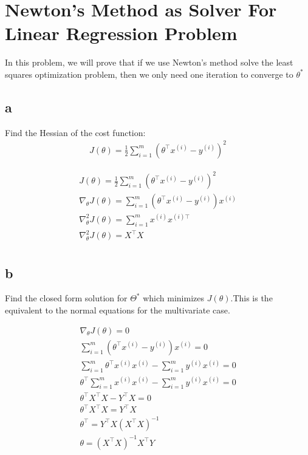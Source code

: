 \documentclass[12pt]{article}
\begin{document}
\section{Newton’s Method as Solver For Linear Regression Problem}
In this problem, we will prove that if we use Newton’s method solve the least squares optimization problem, then we only need one iteration to converge to $\theta^{*}$
\subsection{a}
Find the Hessian of the cost function:
\begin{gather*}
    J(\theta) = \frac{1}{2} \sum_{i=1}^{m} (\theta^\top x^{(i)} - y^{(i)})^2
\end{gather*}
\begin{qsolve}
    \begin{gather*}
        J(\theta) = \frac{1}{2} \sum_{i=1}^{m} (\theta^\top x^{(i)} - y^{(i)})^2 \\
        \nabla_\theta J(\theta) = \sum_{i=1}^{m} (\theta^\top x^{(i)} - y^{(i)}) x^{(i)} \\
        \nabla_\theta^2 J(\theta) = \sum_{i=1}^{m} x^{(i)} x^{(i)\top} \\
        \nabla_\theta^2 J(\theta) = X^\top X \\
    \end{gather*}
\end{qsolve}

\subsection{b}
Find the closed form solution for $\Theta^{*}$ which minimizes $J(\theta)$.This is the equivalent to the normal equations for the multivariate case.
\begin{qsolve}
    \begin{gather*}
        \nabla_\theta J(\theta) = 0 \\
        \sum_{i=1}^{m} (\theta^\top x^{(i)} - y^{(i)}) x^{(i)} = 0 \\
        \sum_{i=1}^{m} \theta^\top x^{(i)} x^{(i)} - \sum_{i=1}^{m} y^{(i)} x^{(i)} = 0 \\
        \theta^\top \sum_{i=1}^{m} x^{(i)} x^{(i)} - \sum_{i=1}^{m} y^{(i)} x^{(i)} = 0 \\
        \theta^\top X^\top X - Y^\top X = 0 \\
        \theta^\top X^\top X = Y^\top X \\
        \theta^\top = Y^\top X (X^\top X)^{-1} \\
        \theta = (X^\top X)^{-1} X^\top Y \\
    \end{gather*}
\end{qsolve}
\end{document}
